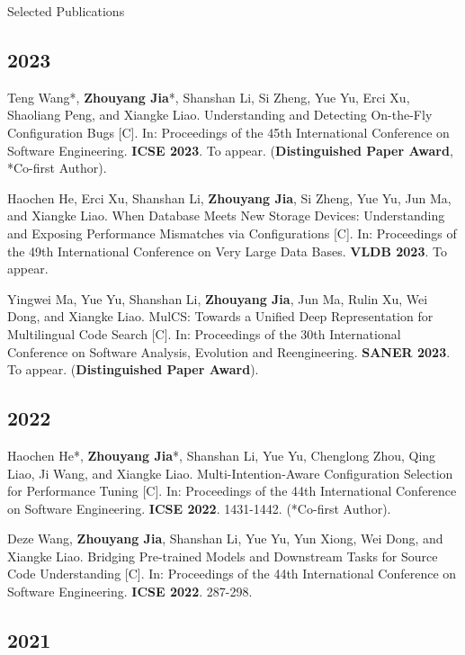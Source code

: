 \documentclass{resume}
\begin{document}
\begin{rSection}{Selected Publications}
	
\subsection*{2023}
	
Teng Wang*, \textbf{Zhouyang Jia}*, Shanshan Li, Si Zheng, Yue Yu, Erci Xu, Shaoliang Peng, and Xiangke Liao. Understanding and Detecting On-the-Fly Configuration Bugs [C]. In: Proceedings of the 45th International Conference on Software Engineering. \textbf{ICSE 2023}. To appear. (\textbf{Distinguished Paper Award}, *Co-first Author).

Haochen He, Erci Xu, Shanshan Li, \textbf{Zhouyang Jia}, Si Zheng, Yue Yu, Jun Ma, and Xiangke Liao. When Database Meets New Storage Devices: Understanding and Exposing Performance Mismatches via Configurations [C]. In: Proceedings of the 49th International Conference on Very Large Data Bases. \textbf{VLDB 2023}. To appear.

Yingwei Ma, Yue Yu, Shanshan Li, \textbf{Zhouyang Jia}, Jun Ma, Rulin Xu, Wei Dong, and Xiangke Liao. MulCS: Towards a Unified Deep Representation for Multilingual Code Search [C]. In: Proceedings of the 30th International Conference on Software Analysis, Evolution and Reengineering. \textbf{SANER 2023}. To appear. (\textbf{Distinguished Paper Award}).

\subsection*{2022}

Haochen He*, \textbf{Zhouyang Jia}*, Shanshan Li, Yue Yu, Chenglong Zhou, Qing Liao, Ji Wang, and Xiangke Liao. Multi-Intention-Aware Configuration Selection for Performance Tuning [C]. In: Proceedings of the 44th International Conference on Software Engineering. \textbf{ICSE 2022}. 1431-1442. (*Co-first Author).

Deze Wang, \textbf{Zhouyang Jia}, Shanshan Li, Yue Yu, Yun Xiong, Wei Dong, and Xiangke Liao. Bridging Pre-trained Models and Downstream Tasks for Source Code Understanding [C]. In: Proceedings of the 44th International Conference on Software Engineering. \textbf{ICSE 2022}. 287-298.

\subsection*{2021}


\end{rSection}
\end{document}
